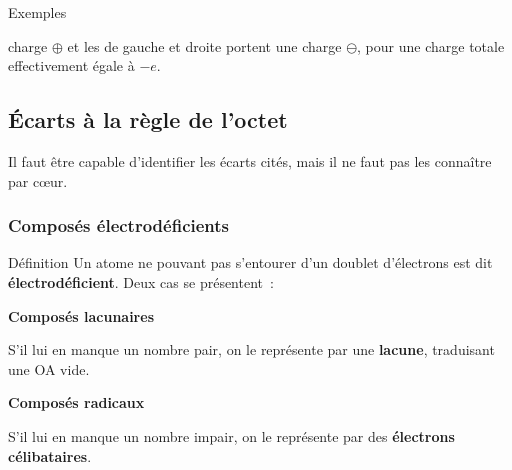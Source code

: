 \documentclass[../main/main.tex]{subfiles}
\begin{document}
\begin{rexem}{Exemples}
\begin{enumerate}[resume]
\begin{itemize}[label=$\triangleright$, leftmargin=20pt]
                    charge $\oplus$ et les  de gauche et droite portent
                    une charge $\ominus$, pour une charge totale effectivement
                    égale à $-e$.
            \end{itemize}
    \end{enumerate}
    \begin{center}
    \end{center}
\end{rexem}

\subsection{Écarts à la règle de l'octet}
Il faut être capable d'identifier les écarts cités, mais il ne faut pas les
connaître par cœur.

\subsubsection{Composés électrodéficients}
\begin{tdefi}{Définition}
    Un atome ne pouvant pas s'entourer d'un doublet d'électrons est dit
    \textbf{électrodéficient}. Deux cas se présentent~: \smallbreak
    \begin{side}
        \begin{center}
            \textbf{Composés lacunaires}
        \end{center}
        S'il lui en manque un nombre pair, on le représente par une
        \textbf{lacune}, traduisant une OA vide.
        \tcblower
        \begin{center}
            \textbf{Composés radicaux}
        \end{center}
        S'il lui en manque un nombre impair, on le représente par des
        \textbf{électrons célibataires}.
    \end{side}
\end{tdefi}

\begin{center}
    \hfill
    \hfill
    \hfill
    \hfill~
\end{center}
\end{document}
